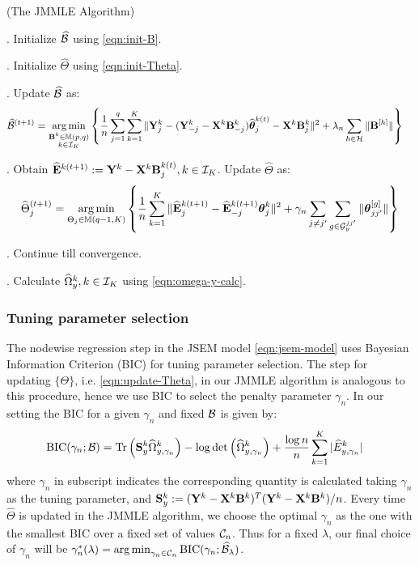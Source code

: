 \begin{Algorithm}
(The JMMLE Algorithm)
\label{algo:jmmle-algo}

. Initialize $\widehat {{\cal{B}}}$ using \eqref{eqn:init-B}.

. Initialize $\widehat \Theta$ using \eqref{eqn:init-Theta}.

. Update $\widehat {{\cal{B}}}$ as:
%
\begin{align}\label{eqn:update-B}
\widehat {{\cal{B}}}^{(t+1)} &= \operatorname*{arg\,min}_{\substack{{\mathbf{B}}^k \in {\mathbb{M}}(p,q)\\k \in {\cal{I}}_K}} \left\{ \frac{1}{n} \sum_{j=1}^q \sum_{k=1}^K \| {\mathbf{Y}}^k_j - ({\mathbf{Y}}_{-j}^k - {\mathbf{X}}^k {\mathbf{B}}_{-j}^k) \widehat {{\boldsymbol{\theta}}}_j^{k (t)} - {\mathbf{X}}^k {\mathbf{B}}_j^{k } \|^2
+ \lambda_n \sum_{h \in {\cal{H}}} \| {\mathbf{B}}^{[h]} \| \right\}
\end{align}

. Obtain $\widehat {{\mathbf{E}}}^{k (t+1)} := {\mathbf{Y}}^k - {\mathbf{X}}^k {\mathbf{B}}_j^{k (t)}, k \in {\cal{I}}_K$. Update $\widehat \Theta$ as:
%
\begin{align}\label{eqn:update-Theta}
\widehat \Theta_j^{(t+1)} = \operatorname*{arg\,min}_{\Theta_j \in {\mathbb{M}}(q-1, K)}
\left\{ \frac{1}{n} \sum_{k=1}^K
\| \widehat {{\mathbf{E}}}_j^{k (t+1)} - \widehat {{\mathbf{E}}}_{-j}^{k (t+1)} {\boldsymbol{\theta}}_j^k \|^2
+ \gamma_n \sum_{j \neq j'} \sum_{g \in {\cal{G}}_y^{jj'}} \| {\boldsymbol{\theta}}_{jj'}^{[g]} \| \right\}
\end{align}

. Continue till convergence.

. Calculate $\widehat \Omega_y^k, k \in {\cal{I}}_K$ using \eqref{eqn:omega-y-calc}.
\end{Algorithm}

\subsubsection{Tuning parameter selection}
The nodewise regression step in the JSEM model \eqref{eqn:jsem-model} uses Bayesian Information Criterion (BIC) for tuning parameter selection. The step for updating $\{ \Theta \}$, i.e. \eqref{eqn:update-Theta}, in our JMMLE algorithm is analogous to this procedure, hence we use BIC to select the penalty parameter $\gamma_n$. In our setting the BIC for a given $\gamma_n$ and fixed ${\cal{B}}$ is given by:
%
\begin{align*}
\text{BIC} (\gamma_n; {\cal{B}}) &=
\operatorname*{Tr} \left( {\mathbf{S}}_y^k \widehat \Omega_{y,\gamma_n}^k \right) - \log \det \left( \widehat \Omega_{y,\gamma_n}^k \right) +
\frac{\log n}{n} \sum_{k=1}^K | \widehat E_{y,\gamma_n}^k |
\end{align*}
%
where $\gamma_n$ in subscript indicates the corresponding quantity is calculated taking $\gamma_n$ as the tuning parameter, and ${\mathbf{S}}_y^k := ({\mathbf{Y}}^k - {\mathbf{X}}^k {\mathbf{B}}^k)^T ({\mathbf{Y}}^k - {\mathbf{X}}^k {\mathbf{B}}^k)/n$. Every time $\widehat \Theta$ is updated in the JMMLE algorithm, we choose the optimal $\gamma_n$ as the one with the smallest BIC over a fixed set of values ${\cal{C}}_n$. Thus for a fixed $\lambda$, our final choice of $\gamma_n$ will be 
$
\gamma_n^* (\lambda) = \operatorname*{arg\,min}_{\gamma_n \in {\cal{C}}_n} \text{BIC} (\gamma_n; \widehat {{\cal{B}}}_\lambda)
$.

